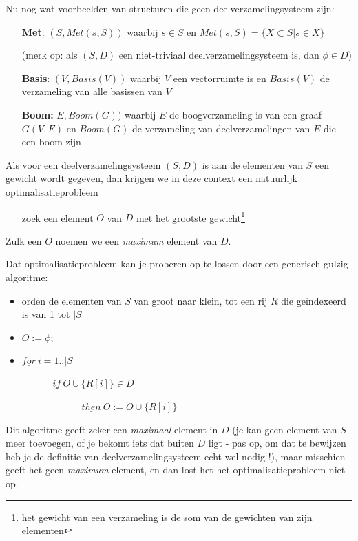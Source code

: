 Nu nog wat voorbeelden van structuren die geen deelverzamelingsysteem zijn:

\begin{itemize}
\item[{\bf Met}:]
$(S,Met(s,S))$ waarbij $s \in S$ en $Met(s,S) = \{X \subset S| s \in X\}$

(merk op: als $(S,D)$ een niet-triviaal deelverzamelingsysteem is, dan $\phi \in D$)

\item[{\bf Basis}:]
$(V,Basis(V))$ waarbij $V$ een vectorruimte is en $Basis(V)$ de
verzameling van alle basissen van $V$

\item[{\bf Boom:}]
$E,Boom(G))$ waarbij $E$ de boogverzameling is van een graaf $G(V,E)$
en $Boom(G)$ de verzameling van deelverzamelingen van $E$ die een boom
zijn

\end{itemize}

Als voor een deelverzamelingsysteem $(S,D)$ is aan de elementen van
$S$ een gewicht wordt gegeven, dan krijgen we in deze context een
natuurlijk optimalisatieprobleem 

\begin{itemize}
\item[]
zoek een element $O$ van $D$ met het grootste gewicht\footnote{het
gewicht van een verzameling is de som van de gewichten van zijn
elementen}
\end{itemize}
Zulk een $O$ noemen we een {\em maximum} element van $D$.

Dat optimalisatieprobleem kan je proberen op te lossen door een
generisch gulzig algoritme:

\begin{itemize}
\item orden de elementen van $S$ van groot naar klein, tot een rij $R$
die ge\"indexeerd is van 1 tot $|S|$

\item $O := \phi$;

\item $\underline{for}~ i = 1 .. |S|$ 
\begin{itemize}
\item[] ~~~$\underline{if}~ O \cup \{R[i]\} \in D$
\item[] ~~~~~~~~~$\underline{then}~ O := O \cup \{R[i]\}$
\end{itemize}
\end{itemize}

Dit algoritme geeft zeker een {\em maximaal} element in $D$ (je kan
geen element van $S$ meer toevoegen, of je bekomt iets dat buiten
$D$ ligt - pas op, om dat te bewijzen heb je de definitie van
deelverzamelingsysteem echt wel nodig !), maar misschien geeft het
geen {\em maximum} element, en dan lost het het optimalisatieprobleem
niet op.

